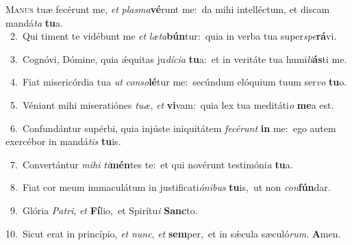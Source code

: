 \lettrine{\initial\textcolor{\initialcolor}{M}}{anus} tuæ fecérunt me, \textit{et} \textit{plas}\-\textit{ma}\textbf{vé}runt me:~\star da mihi intelléctum, et discam mandá\textit{ta} \textbf{tu}\-a.\\
{\numbfont\textcolor{\numbcolor}{~2.}}~Qui timent te vidébunt me \textit{et} \textit{læ}\-\textit{ta}\textbf{bún}tur:~\star quia in verba tua super\-\textit{spe}\-\textbf{rá}vi.\par
{\numbfont\textcolor{\numbcolor}{~3.}}~Cognóvi, Dómine, quia ǽquitas ju\-\textit{dí}\-\textit{ci}\textit{a} \textbf{tu}\-a:~\star et in veritáte tua humi\-\textit{li}\-\textbf{ás}ti me.\par
{\numbfont\textcolor{\numbcolor}{~4.}}~Fiat misericórdia tua \textit{ut} \textit{con}\-\textit{so}\textbf{lé}tur me:~\star secúndum elóquium tuum ser\textit{vo} \textbf{tu}\-o.\par
{\numbfont\textcolor{\numbcolor}{~5.}}~Véniant mihi miseratiónes \textit{tu}\-\textit{æ}, \textit{et} \textbf{vi}\-vam:~\star quia lex tua meditáti\textit{o} \textbf{me}\-a est.\par
{\numbfont\textcolor{\numbcolor}{~6.}}~Confundántur supérbi, quia injúste iniquitátem \textit{fe}\-\textit{cé}\textit{runt} \textbf{in} me:~\star ego autem exercébor in mandá\textit{tis} \textbf{tu}\-is.\par
{\numbfont\textcolor{\numbcolor}{~7.}}~Convertántur \textit{mi}\-\textit{hi} \textit{ti}\-\textbf{mén}tes te:~\star et qui novérunt testimóni\textit{a} \textbf{tu}\-a.\par
{\numbfont\textcolor{\numbcolor}{~8.}}~Fiat cor meum immaculátum in justificati\-\textit{ó}\-\textit{ni}\textit{bus} \textbf{tu}\-is,~\star ut non \textit{con}\-\textbf{fún}dar.\par
{\numbfont\textcolor{\numbcolor}{~9.}}~Glória \textit{Pa}\-\textit{tri}, \textit{et} \textbf{Fí}\-lio,~\star et Spirítu\textit{i} \textbf{Sanc}\-to.\par
{\numbfont\textcolor{\numbcolor}{10.}}~Sicut erat in princípio, \textit{et} \textit{nunc}\-, \textit{et} \textbf{sem}\-per,~\star et in sǽcula sæculó\-\textit{rum}\-. \textbf{A}\-men.\par

